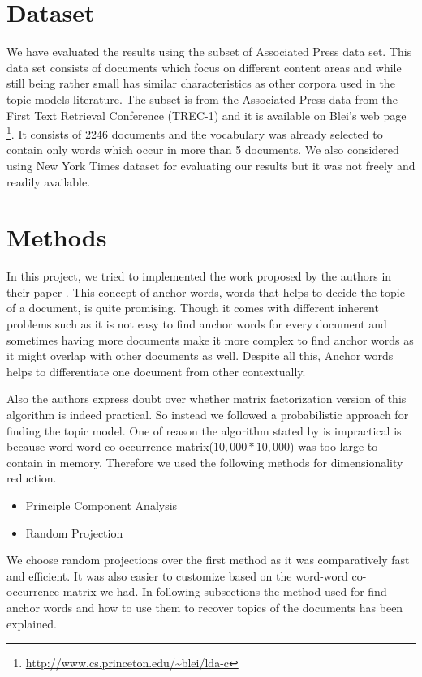 \documentclass[a4paper,11pt]{article}
\begin{document}
\section{Dataset}
We have evaluated the results using the subset of Associated Press data set. This data set consists of documents which focus on different content areas and while still being rather small has similar characteristics as other corpora used in the topic models literature. The subset is from the Associated Press data from the First Text Retrieval Conference (TREC-1) and it is available on Blei's web page \footnote{\url{http://www.cs.princeton.edu/~blei/lda-c}}. It consists of 2246 documents and the vocabulary was already selected to contain only words which occur in more than 5 documents. We also considered using New York Times dataset for evaluating our results but it was not freely and readily available.

\section{Methods}
In this project, we tried to implemented the work proposed by the authors in their paper \cite{tm}. This concept of anchor words, words that helps to decide the topic of a document, is quite promising. Though it comes with different inherent problems such as it is not easy to find anchor words for every document and sometimes having more documents make it more complex to find anchor words as it might overlap with other documents as well. Despite all this, Anchor words helps to differentiate one document from other contextually. 

Also the authors express doubt over whether matrix factorization version of this algorithm is indeed practical. So instead we followed a probabilistic approach for finding the topic model. One of reason the algorithm stated by \cite{tm} is impractical is because word-word co-occurrence matrix($10,000*10,000$) was too large to contain in memory. Therefore we used the following methods for dimensionality reduction.

\begin{itemize}
\item Principle Component Analysis
\item Random Projection 
\end{itemize} 

We choose random projections over the first method as it was comparatively fast and efficient. It was also easier to customize based on the word-word co-occurrence matrix we had. In following subsections the method used for find anchor words and how to use them to recover topics of the documents has been explained. \\
\end{document}
